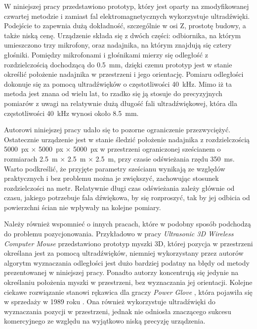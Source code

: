  W niniejszej pracy przedstawiono prototyp, który jest oparty na zmodyfikowanej czwartej metodzie i zamiast 
 fal elektromagnetycznych wykorzystuje ultradźwięki. 
 Podejście to zapewnia dużą dokładność, szczególnie w osi Z, prostotę budowy, a także niską cenę.
 Urządzenie składa się z dwóch części: odbiornika, na którym umieszczono trzy mikrofony, oraz nadajnika,
 na którym znajdują się cztery głośniki. Pomiędzy mikrofonami i głośnikami mierzy się odległość z rozdzielczością
 dochodzącą do \SI{0,5}{mm}, dzięki czemu prototyp jest w stanie określić położenie nadajnika
w przestrzeni i jego orientację. 
Pomiaru odległości dokonuje się za pomocą ultradźwięków o częstotliwości \SI{40}{kHz}.
Mimo iż ta metoda jest znana od wielu lat, to rzadko się ją stosuje do precyzyjnych pomiarów
z uwagi na relatywnie dużą długość fali ultradźwiękowej,
która dla częstotliwości \SI{40}{kHz} wynosi około \SI{8.5}{mm}.

Autorowi niniejszej pracy udało się to pozorne ograniczenie przezwyciężyć.
Ostatecznie urządzenie jest w stanie śledzić położenie nadajnika z rozdzielczością 
\SI{5000}{px} $\times$ \SI{5000}{px} $\times$ \SI{5000}{px} w przestrzeni ograniczonej sześcianem o rozmiarach 
\SI{2,5}{m} $\times$ \SI{2,5}{m}  $\times$ \SI{2,5}{m}, przy czasie odświeżania rzędu \SI{350}{ms}.
Warto podkreślić, że przyjęte parametry sześcianu wynikają ze względów praktycznych i bez 
problemu można je zwiększyć, zachowując stosunek rozdzielczości na metr.
Relatywnie długi czas odświeżania zależy głównie od czasu,  
 jakiego potrzebuje fala dźwiękowa, by się rozproszyć,
 tak by jej odbicia od powierzchni ścian nie wpływały na kolejne pomiary.

Należy również wspomnieć o innych pracach, które w podobny sposób podchodzą do problemu pozycjonowania. Przykładowo 
w pracy \textit{Ultrasonic 3D Wireless Computer Mouse} \cite{bib:mouse} przedstawiono prototyp myszki 3D, której
pozycja w przestrzeni określana jest za pomocą ultradźwięków, niemniej wykorzystany przez autorów algorytm wyznaczania 
odległości jest dużo bardziej podatny na błędy od metody prezentowanej w niniejszej pracy. Ponadto autorzy koncentrują się jedynie
na określaniu położenia myszki w przestrzeni, bez wyznaczania jej orientacji.
Kolejne ciekawe rozwiązanie stanowi rękawica dla graczy 
\textit{Power Glove} \cite{bib:powerGlove}, która pojawiła się w sprzedaży w 1989 roku \cite{bib:powerGlove2}. 
Ona również wykorzystuje ultradźwięki do wyznaczania pozycji
w przestrzeni, jednak nie odniosła  znaczącego sukcesu komercyjnego ze względu na wyjątkowo niską precyzję urządzenia.


